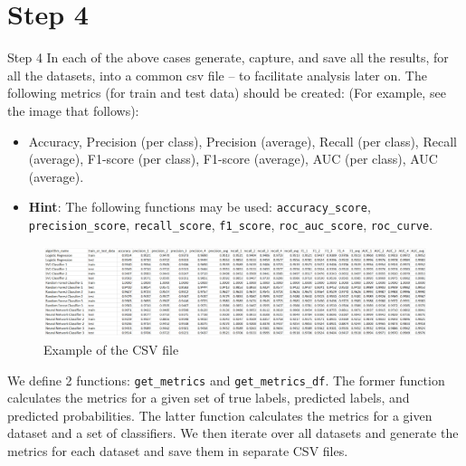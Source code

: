\section*{Step 4}

\begin{custombox}[label={box:Q4}]{Step 4}
	In each of the above cases generate, capture, and save all the results, for all the datasets, into a common csv file – to facilitate analysis later on. The following metrics (for train and test data) should be created: (For example, see the image that follows):

    \begin{itemize}
        \item Accuracy, Precision (per class), Precision (average), Recall (per class), Recall (average), F1-score (per class), F1-score (average), AUC (per class), AUC (average). 
        \item \textbf{Hint}: The following functions may be used: \texttt{accuracy\_score}, \texttt{precision\_score}, \texttt{recall\_score}, \texttt{f1\_score}, \texttt{roc\_auc\_score}, \texttt{roc\_curve}.
    \end{itemize}

    \begin{figure}[H]
        \centering
        \includegraphics[width=\textwidth]{Images/Step-4-example.png}
        \caption{Example of the CSV file}
        \label{fig:Q4}
    \end{figure}
\end{custombox}

\vspace{5mm}

We define 2 functions: \texttt{get\_metrics} and \texttt{get\_metrics\_df}. The former function calculates the metrics for a given set of true labels, predicted labels, and predicted probabilities. The latter function calculates the metrics for a given dataset and a set of classifiers. We then iterate over all datasets and generate the metrics for each dataset and save them in separate CSV files.

\clearpage

